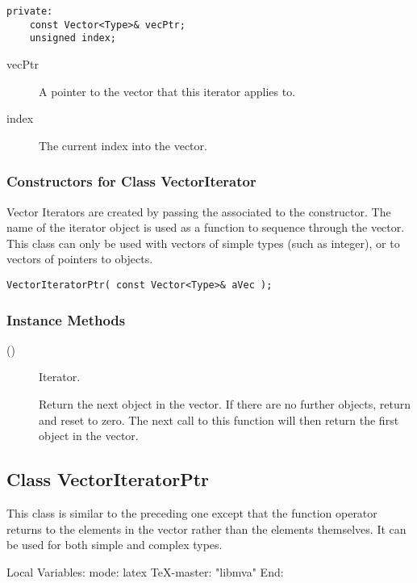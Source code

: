 \begin{verbatim}
private:
    const Vector<Type>& vecPtr;
    unsigned index;
\end{verbatim}

\begin{description}
\item[vecPtr] \texonly{---} A pointer to the vector that this iterator
  applies to.
\item[index] \texonly{---} The current index into the vector.
\end{description}


\subsubsection{Constructors for Class VectorIterator}

Vector Iterators are created by passing the associated
 to the  constructor.
The name of the iterator object is used as a function to sequence
through the vector.  This class can only be used with vectors of
simple types (such as integer), or to vectors of pointers to objects.  

\begin{verbatim}
VectorIteratorPtr( const Vector<Type>& aVec );
\end{verbatim}

\subsubsection{Instance Methods}

\begin{description}
\item[()] \texonly{---} Iterator.\\

Return the next object in the vector.  If there are no further
objects, return  and reset  to zero.  The next
call to this function will then return the first object in the vector.

\end{description}

\subsection{Class VectorIteratorPtr}

This class is similar to the preceding one except that the function
operator returns  to the elements in the vector rather
than the elements themselves.  It can be used for both simple and
complex types.

\C Local Variables: 
\C mode: latex
\C TeX-master: "libmva"
\C End: 
